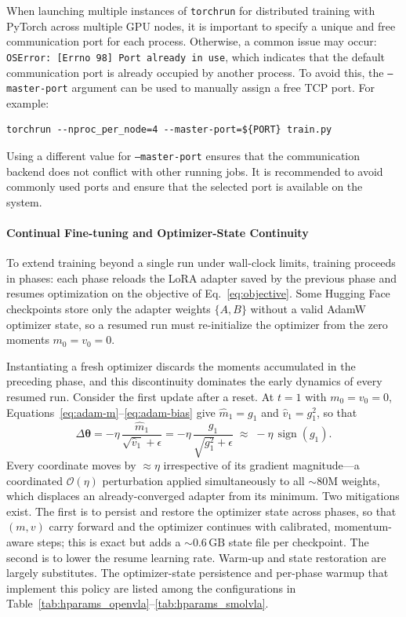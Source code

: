 \documentclass[english,12pt,a4paper,pdftex,elec,utf8]{aaltothesis}
\begin{document}
When launching multiple instances of \texttt{torchrun} for distributed training with PyTorch across multiple GPU nodes, it is important to specify a unique and free communication port for each process. Otherwise, a common issue may occur: \texttt{OSError: [Errno 98] Port already in use}, which indicates that the default communication port is already occupied by another process. To avoid this, the \texttt{--master-port} argument can be used to manually assign a free TCP port. For example:

\begin{verbatim}
torchrun --nproc_per_node=4 --master-port=${PORT} train.py
\end{verbatim}

Using a different value for \texttt{--master-port} ensures that the communication backend does not conflict with other running jobs. It is recommended to avoid commonly used ports and ensure that the selected port is available on the system.

\paragraph{Continual Fine-tuning and Optimizer-State Continuity}
\label{sec:exp-continual}

To extend training beyond a single run under wall-clock limits, training proceeds
in phases: each phase reloads the LoRA adapter saved by the previous phase and
resumes optimization on the objective of Eq.~\eqref{eq:objective}. Some Hugging Face checkpoints store only the adapter weights $\{A, B\}$ without a valid AdamW optimizer state, so a resumed run must re-initialize the optimizer from the zero moments $m_0 = v_0 = 0$.

Instantiating a fresh optimizer discards the moments accumulated in the preceding
phase, and this discontinuity dominates the early dynamics of every resumed run.
Consider the first update after a reset. At $t = 1$ with $m_0 = v_0 = 0$,
Equations~\eqref{eq:adam-m}--\eqref{eq:adam-bias} give $\hat{m}_1 = g_1$ and
$\hat{v}_1 = g_1^2$, so that
\begin{equation}
\Delta\boldsymbol{\theta}
= -\eta\, \frac{\hat{m}_1}{\sqrt{\hat{v}_1}+\epsilon}
= -\eta\, \frac{g_1}{\sqrt{g_1^2}+\epsilon}
\;\approx\; -\eta\, \operatorname{sign}(g_1).
\label{eq:reset-shock}
\end{equation}
Every coordinate moves by $\approx\!\eta$ irrespective of its gradient
magnitude---a coordinated $\mathcal{O}(\eta)$ perturbation applied simultaneously
to all $\sim\!80\text{M}$ weights, which displaces an already-converged adapter
from its minimum. Two mitigations exist. The first is to persist and restore the optimizer
state across phases, so that $(m, v)$ carry forward and the optimizer continues
with calibrated, momentum-aware steps; this is exact but adds a
$\sim\!0.6\,\text{GB}$ state file per checkpoint. The second is to lower the resume learning rate. Warm-up and state restoration are largely
substitutes. The optimizer-state persistence and per-phase warmup that implement this policy are listed among the configurations in Table~\ref{tab:hparams_openvla}--\ref{tab:hparams_smolvla}.
\end{document}
